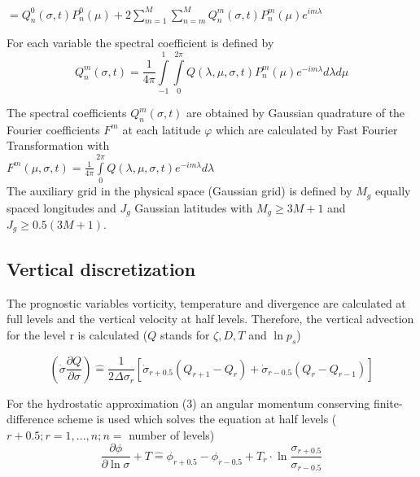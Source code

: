 \begin{center}
$=  Q_n^0 (\sigma , t) P_n^0 (\mu) 
+ 2   \sum_{m = 1}^{M} \sum_{n =
    m}^{M} Q_n^m (\sigma , t) P_n^m (\mu) e ^{im\lambda}$ 
\end{center}


For each variable the spectral coefficient is defined by
\begin{equation}
{\displaystyle Q_n^m (\sigma , t) = \frac{1}{4 \pi} \int\limits_{-1}^{1}
  \int\limits_{0}^{2 \pi} Q(\lambda , \mu , \sigma , t) P_n^m (\mu) e^{ -i m
    \lambda} d \lambda d \mu}
\end{equation}


The spectral coefficients $Q_n^m (\sigma , t)$
are obtained by Gaussian quadrature 
of the Fourier coefficients $F^m$ at each latitude $\varphi$ which 
are calculated by Fast Fourier 
Transformation with \\
${\displaystyle F^m (\mu, \sigma , t) = \frac{1}{4 \pi}  \int\limits_{0}^{2 \pi} Q(\lambda , \mu , \sigma , t) e^{ -i m \lambda} d \lambda}$\\
The auxiliary grid in the physical space (Gaussian grid)
is defined by $M_g$ equally spaced longitudes 
and $J_g$ Gaussian latitudes with
$M_g \ge 3 M + 1$ and $J_g  \ge 0.5 (3 M + 1)$.



\subsection{Vertical discretization} 
The prognostic variables vorticity, temperature and 
divergence are calculated at full levels and the vertical velocity at half 
levels. Therefore, the vertical advection for the level r  is calculated
($Q$ stands for $\zeta, D,T$ and $ \ln p_s$)

\begin{equation}
{\displaystyle ( \dot{\sigma} \frac{\partial Q}{\partial \sigma} ) 
\hat{=} 
\frac{1}{2\Delta \sigma_r } [\dot{\sigma}_{r + 0.5} (Q_{r+1} - Q_r) + \dot{\sigma}_{r - 0.5} (Q_r - Q_{r-1})]} 
\end{equation}


For the hydrostatic approximation (3)
an angular momentum
conserving finite-difference scheme 
\cite{simmons1981}
is used which solves the equation at half levels 
($r+0.5 ;r=1,...,n; n=$ number of levels)
\begin{equation}
\displaystyle  
\frac{\partial \phi}{\partial \ln \sigma}+T
\hat{=} 
\phi_{r+0.5}-\phi_{r-0.5}+
 T_r \cdot \ln \frac{\sigma_{r+0.5}}{\sigma_{r-0.5}}
\end{equation}

